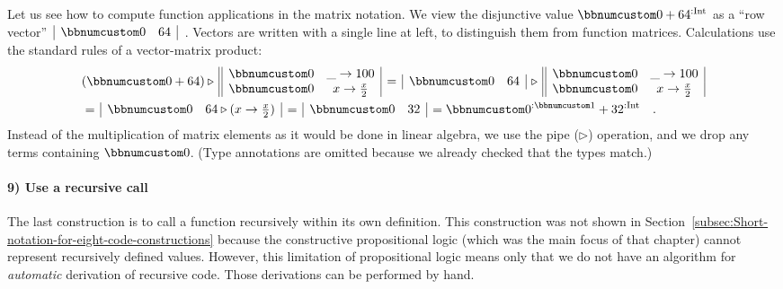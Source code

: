 Let us see how to compute function applications in the matrix notation.
We view the disjunctive value $\bbnum 0+64^{:\text{Int}}$ as a \textsf{``}row
vector\textsf{''} $\,\begin{array}{|cc|}
\bbnum 0 & 64\end{array}$~. Vectors are written with a single line at left, to distinguish
them from function matrices. Calculations use the standard rules of
a vector-matrix product:
\begin{align*}
 & (\bbnum 0+64)\triangleright\,\begin{array}{||cc|}
\bbnum 0 & \_\rightarrow100\\
\bbnum 0 & x\rightarrow\frac{x}{2}
\end{array}\,=\,\begin{array}{|cc|}
\bbnum 0 & 64\end{array}\,\triangleright\,\begin{array}{||cc|}
\bbnum 0 & \_\rightarrow100\\
\bbnum 0 & x\rightarrow\frac{x}{2}
\end{array}\\
 & =\,\begin{array}{|cc|}
\bbnum 0 & 64\triangleright(x\rightarrow\frac{x}{2})\end{array}\,=\,\begin{array}{|cc|}
\bbnum 0 & 32\end{array}\,=\bbnum 0^{:\bbnum 1}+32^{:\text{Int}}\quad.
\end{align*}
Instead of the multiplication of matrix elements as it would be done
in linear algebra, we use the pipe ($\triangleright$) operation,
and we drop any terms containing $\bbnum 0$. (Type annotations are
omitted because we already checked that the types match.) 

\paragraph{9) Use a recursive call}

The last construction is to call a function recursively within its
own definition. This construction was not shown in Section~\ref{subsec:Short-notation-for-eight-code-constructions}
because the constructive propositional logic (which was the main focus
of that chapter) cannot represent recursively defined values. However,
this limitation of propositional logic means only that we do not have
an algorithm for \emph{automatic} derivation of recursive code. Those
derivations can be performed by hand. 

